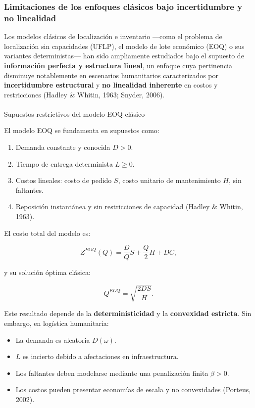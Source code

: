 \documentclass[
  spanish,
  letterpaper,
  DIV=11,
  numbers=noendperiod]{scrartcl}
\makeatletter
\let\oldparagraph\paragraph
\renewcommand{\paragraph}{
    \@ifstar
      \xxxParagraphStar
      \xxxParagraphNoStar
  }
\newcommand{\xxxParagraphStar}[1]{\oldparagraph*{#1}\mbox{}}
\newcommand{\xxxParagraphNoStar}[1]{\oldparagraph{#1}\mbox{}}
\providecommand{\tightlist}{%
  \setlength{\itemsep}{0pt}\setlength{\parskip}{0pt}}
\makeatother
\begin{document}
\subsubsection{Limitaciones de los enfoques clásicos bajo incertidumbre
y no
linealidad}\label{limitaciones-de-los-enfoques-cluxe1sicos-bajo-incertidumbre-y-no-linealidad}

Los modelos clásicos de localización e inventario ---como el problema de
localización sin capacidades (UFLP), el modelo de lote económico (EOQ) o
sus variantes deterministas--- han sido ampliamente estudiados bajo el
supuesto de \textbf{información perfecta y estructura lineal}, un
enfoque cuya pertinencia disminuye notablemente en escenarios
humanitarios caracterizados por \textbf{incertidumbre estructural} y
\textbf{no linealidad inherente} en costos y restricciones (Hadley \&
Whitin, 1963; Snyder, 2006).

\paragraph{Supuestos restrictivos del modelo EOQ
clásico}\label{supuestos-restrictivos-del-modelo-eoq-cluxe1sico}

El modelo EOQ se fundamenta en supuestos como:

\begin{enumerate}
\def\labelenumi{\arabic{enumi}.}
\tightlist
\item
  Demanda constante y conocida \(D>0\).
\item
  Tiempo de entrega determinista \(L \geq 0\).
\item
  Costos lineales: costo de pedido \(S\), costo unitario de
  mantenimiento \(H\), sin faltantes.
\item
  Reposición instantánea y sin restricciones de capacidad (Hadley \&
  Whitin, 1963).
\end{enumerate}

El costo total del modelo es:

\[
Z^{EOQ}(Q)=\frac{D}{Q}S+\frac{Q}{2}H+DC,
\]

y su solución óptima clásica:

\[
Q^{EOQ}=\sqrt{\frac{2DS}{H}}.
\]

Este resultado depende de la \textbf{deterministicidad} y la
\textbf{convexidad estricta}. Sin embargo, en logística humanitaria:

\begin{itemize}
\tightlist
\item
  La demanda es aleatoria \(D(\omega)\).
\item
  \(L\) es incierto debido a afectaciones en infraestructura.
\item
  Los faltantes deben modelarse mediante una penalización finita
  \(\beta>0\).
\item
  Los costos pueden presentar economías de escala y no convexidades
  (Porteus, 2002).
\end{itemize}
\end{document}
